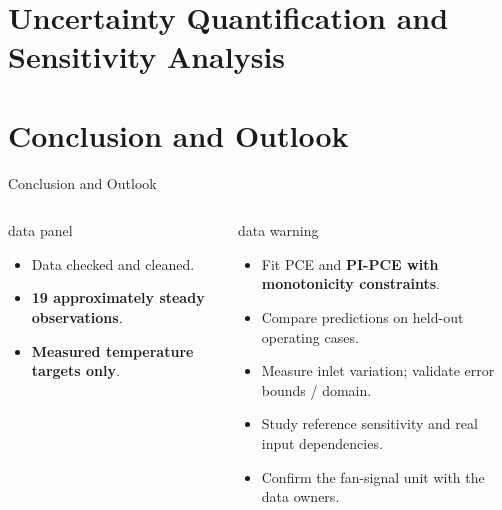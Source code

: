 \section{Uncertainty Quantification and Sensitivity Analysis}







\section{Conclusion and Outlook}

\begin{frame}{Conclusion and Outlook}
  \begin{columns}[T,onlytextwidth]
      \begin{beamercolorbox}[sep=2mm,wd=\linewidth]{data panel}
        \small
        \begin{itemize}
          \item Data checked and cleaned.
          \item \textbf{19 approximately steady observations}.
          \item \textbf{Measured temperature targets only}.
        \end{itemize}
      \end{beamercolorbox}
      \begin{beamercolorbox}[sep=2mm,wd=\linewidth]{data warning}
        \small
        \begin{itemize}
          \item Fit PCE and \textbf{PI-PCE with monotonicity constraints}.
          \item Compare predictions on held-out operating cases.
          \item Measure inlet variation; validate error bounds / domain.
          \item Study reference sensitivity and real input dependencies.
          \item Confirm the fan-signal unit with the data owners.
        \end{itemize}
      \end{beamercolorbox}
  \end{columns}
\end{frame}
